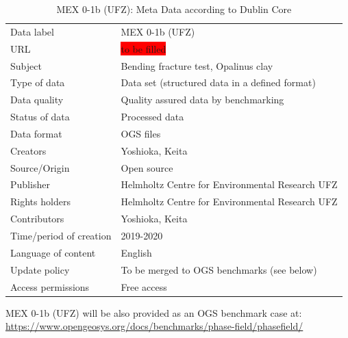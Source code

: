 \begin{table}[!ht]
\caption{MEX 0-1b (UFZ): Meta Data according to Dublin Core}
\label{tab:dms-mex0-1a}
\small
\begin{tabular}{R{3.5cm}|L{7.5cm}}
\hline
%
Data label & MEX 0-1b (UFZ) \\
URL & \colorbox{red}{to be filled} \\ 
Subject  & Bending fracture test, Opalinus clay \\
Type of data  & Data set (structured data in a defined format) \\
Data quality  & Quality assured data by benchmarking \\
Status of data  & Processed data \\
Data format  & OGS files \\
Creators  & Yoshioka, Keita  \\
Source/Origin & Open source \\
Publisher  & Helmholtz Centre for Environmental Research UFZ \\
Rights holders & Helmholtz Centre for Environmental Research UFZ \\
Contributors & Yoshioka, Keita \\
Time/period of creation & 2019-2020 \\
Language of content & English \\
Update policy & To be merged to OGS benchmarks (see below) \\
Access permissions & Free access \\
%
\hline
\end{tabular}
\end{table}

MEX 0-1b (UFZ) will be also provided as an OGS benchmark case at:\\
\small
\url{https://www.opengeosys.org/docs/benchmarks/phase-field/phasefield/}
\normalsize